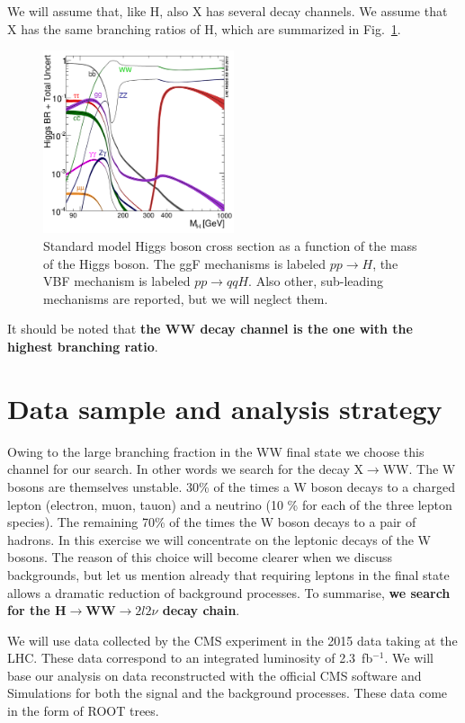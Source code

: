 \documentclass[a4paper,12pt]{article}
\begin{document}
 We will assume that, like H, also X has several decay channels. We assume
 that X has the same branching ratios of H, which are summarized in
 Fig.~\ref{fig:br}.  \begin{figure}
 \centering 
 \includegraphics[width=0.5\textwidth]{images/Higgs_BR.png}
 \caption{Standard model Higgs boson cross section as a function of the mass
 of the Higgs boson. The ggF mechanisms is labeled $pp\rightarrow{}H$, the VBF
 mechanism is labeled $pp\rightarrow{}qqH$. Also other, sub-leading mechanisms
 are reported, but we will neglect them.\label{fig:br}}
\end{figure}
It should be noted that {\bf the WW decay channel is the one with the highest
branching ratio}.

\section{Data sample and analysis strategy}
Owing to the large branching fraction in the WW final state we choose this
channel for our search. In other words we search for the decay
X$\rightarrow$WW. The W bosons are themselves unstable. 30\% of the times
 a W boson decays to a charged lepton (electron, muon, tauon) and a neutrino
 (10 \% for each of the three lepton species). The remaining 70\% of the times
 the W boson decays to a pair of hadrons. In this exercise we will concentrate on the leptonic decays of the W
bosons. The reason of this choice will become clearer when we discuss
backgrounds, but let us mention already that requiring leptons in the final
state allows a dramatic reduction of background processes. 
To summarise, {\bf we search for the H$\rightarrow$WW$\rightarrow{}2l2\nu$ decay
chain}.

We will use data collected by the CMS experiment in the 2015 data taking at
the LHC. These data correspond to an integrated luminosity of 2.3~fb$^{-1}$.
We will base our analysis on data reconstructed with the official CMS software
and Simulations for both the signal and the background processes. These data
come in the form of ROOT trees.
\end{document}
